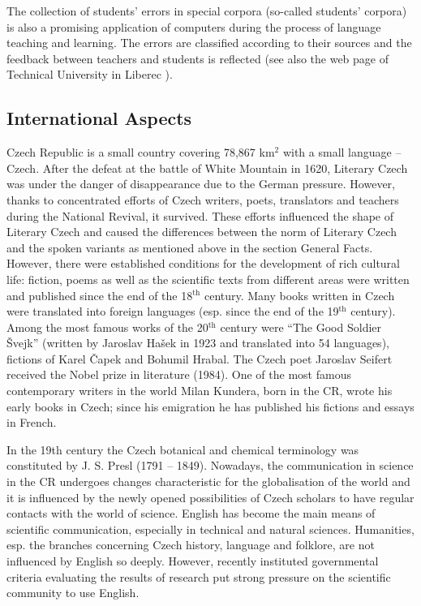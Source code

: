 \begin{multicols}{2}
The collection of students’ errors in special corpora (so-called students’ corpora) is also a promising application of computers during the process of language teaching and learning. The errors are classified according to their sources and the feedback between teachers and students is reflected (see also the web page of Technical University in Liberec \cite{Note10}).

\subsection{International Aspects}

Czech Republic is a small country covering 78,867 km$^{\textrm{2}}$ with a small language – Czech. After the defeat at the battle of White Mountain in 1620, Literary Czech was under the danger of disappearance due to the German pressure. However, thanks to concentrated efforts of Czech writers, poets, translators and teachers during the National Revival, it survived. These efforts influenced the shape of Literary Czech and caused the differences between the norm of Literary Czech and the spoken variants as mentioned above in the section General Facts. However, there were established conditions for the development of rich cultural life: fiction, poems as well as the scientific texts from different areas were written and published since the end of the 18$^{\textrm{th}}$ century. Many books written in Czech were translated into foreign languages (esp. since the end of the 19$^{\textrm{th}}$ century). Among the most famous works of the 20$^{\textrm{th}}$  century were “The Good Soldier Švejk” (written by Jaroslav Hašek in 1923 and translated into 54 languages), fictions of Karel Čapek and Bohumil Hrabal. The Czech poet Jaroslav Seifert received the Nobel prize in literature (1984). One of the most famous contemporary writers in the world Milan Kundera, born in the CR, wrote his early books in Czech; since his emigration he has published his fictions and essays in French.

In the 19th century the Czech botanical and chemical terminology was constituted by J. S. Presl (1791 – 1849). Nowadays, the communication in science in the CR undergoes changes characteristic for the globalisation of the world and it is influenced by the newly opened possibilities of Czech scholars to have regular contacts with the world of science. English has become the main means of scientific communication, especially in technical and natural sciences. Humanities, esp. the branches concerning Czech history, language  and folklore, are not influenced by English so deeply. However, recently instituted governmental criteria evaluating the results of research put strong pressure on the scientific community to use English.


\end{multicols}
